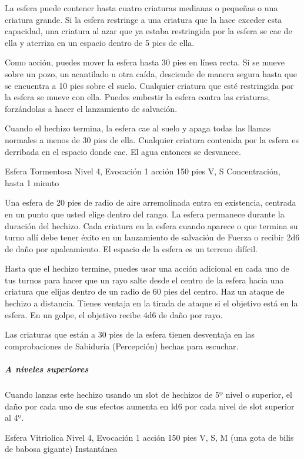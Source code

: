 \documentclass[a4paper,twocolumn,openany,10pt]{dndbook}
\begin{document}
	La esfera puede contener hasta cuatro criaturas medianas o pequeñas o una criatura grande. Si la esfera restringe a una
	criatura que la hace exceder esta capacidad, una criatura al azar que ya estaba restringida por la esfera se cae de ella y
	aterriza en un espacio dentro de 5 pies de ella.
	
	Como acción, puedes mover la esfera hasta 30 pies en línea recta. Si se mueve sobre un pozo, un acantilado u otra caída,
	desciende de manera segura hasta que se encuentra a 10 pies sobre el suelo. Cualquier criatura que esté restringida por la
	esfera se mueve con ella. Puedes embestir la esfera contra las criaturas, forzándolas a hacer el lanzamiento de salvación.
	
	Cuando el hechizo termina, la esfera cae al suelo y apaga todas las llamas normales a menos de 30 pies de ella. Cualquier
	criatura contenida por la esfera es derribada en el espacio donde cae. El agua entonces se desvanece. 

\spellheader%
	{Esfera Tormentosa}
	{Nivel 4, Evocación}
	{1 acción}
	{150 pies}
	{V, S}
	{Concentración, hasta 1 minuto}
	
	Una esfera de 20 pies de radio de aire arremolinada entra en existencia, centrada en un punto que usted elige dentro del
	rango. La esfera permanece durante la duración del hechizo. Cada criatura en la esfera cuando aparece o que termina su turno
	allí debe tener éxito en un lanzamiento de salvación de Fuerza o recibir 2d6 de daño por apaleamiento. El espacio de la
	esfera es un terreno difícil.
	
	Hasta que el hechizo termine, puedes usar una acción adicional en cada uno de tus turnos para hacer que un rayo salte desde
	el centro de la esfera hacia una criatura que elijas dentro de un radio de 60 pies del centro. Haz un ataque de hechizo a
	distancia. Tienes ventaja en la tirada de ataque si el objetivo está en la esfera. En un golpe, el objetivo recibe 4d6 de
	daño por rayo.
	
	Las criaturas que están a 30 pies de la esfera tienen desventaja en las comprobaciones de Sabiduría (Percepción) hechas para
	escuchar.
	
	\subparagraph{A niveles superiores} Cuando lanzas este hechizo usando un slot de hechizos de 5º nivel o superior, el daño
	por cada uno de sus efectos aumenta en ld6 por cada nivel de slot superior al 4º. 

\spellheader%
	{Esfera Vitriolica}
	{Nivel 4, Evocación}
	{1 acción}
	{150 pies}
	{V, S, M (una gota de bilis de babosa gigante)}
	{Instantánea}
	
\end{document}
